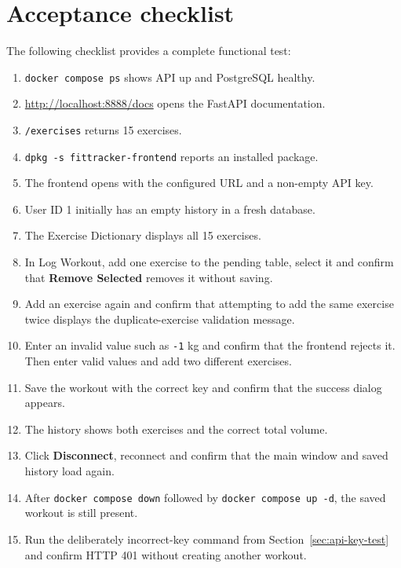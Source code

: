 \documentclass[11pt,a4paper]{article}
\begin{document}
\section{Acceptance checklist}

The following checklist provides a complete functional test:

\begin{enumerate}[leftmargin=1.6em]
  \item \texttt{docker compose ps} shows API up and PostgreSQL healthy.
  \item \url{http://localhost:8888/docs} opens the FastAPI documentation.
  \item \texttt{/exercises} returns 15 exercises.
  \item \texttt{dpkg -s fittracker-frontend} reports an installed package.
  \item The frontend opens with the configured URL and a non-empty API key.
  \item User ID 1 initially has an empty history in a fresh database.
  \item The Exercise Dictionary displays all 15 exercises.
  \item In Log Workout, add one exercise to the pending table, select it and
        confirm that \textbf{Remove Selected} removes it without saving.
  \item Add an exercise again and confirm that attempting to add the same
        exercise twice displays the duplicate-exercise validation message.
  \item Enter an invalid value such as \texttt{-1} kg and confirm that the
        frontend rejects it. Then enter valid values and add two different
        exercises.
  \item Save the workout with the correct key and confirm that the success
        dialog appears.
  \item The history shows both exercises and the correct total volume.
  \item Click \textbf{Disconnect}, reconnect and confirm that the main window
        and saved history load again.
  \item After \texttt{docker compose down} followed by
        \texttt{docker compose up -d}, the saved workout is still present.
  \item Run the deliberately incorrect-key command from
        Section~\ref{sec:api-key-test} and confirm HTTP 401 without creating
        another workout.
\end{enumerate}
\end{document}

